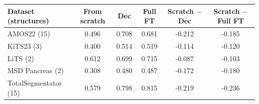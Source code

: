 \begin{tabular}{@{}lccccc@{}}
\toprule
Dataset (structures) & From scratch & Dec & Full FT & Scratch $-$ Dec & Scratch $-$ Full FT \\
\midrule
AMOS22 (15) & 0.496 & 0.708 & 0.681 & -0.212 & -0.185 \\
KiTS23 (3) & 0.400 & 0.514 & 0.519 & -0.114 & -0.120 \\
LiTS (2) & 0.612 & 0.699 & 0.715 & -0.087 & -0.103 \\
MSD Pancreas (2) & 0.308 & 0.480 & 0.487 & -0.172 & -0.180 \\
TotalSegmentator (15) & 0.579 & 0.798 & 0.815 & -0.219 & -0.236 \\
\bottomrule
\end{tabular}

